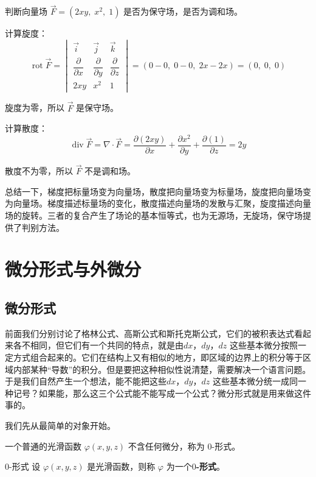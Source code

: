 \begin{myexample}
  判断向量场 \(\vec{F}=(2xy,\;x^2,\;1)\) 是否为保守场，是否为调和场。

  计算旋度：
  \[
  \operatorname{rot}\vec{F}
  =
  \begin{vmatrix}
  \vec{i} & \vec{j} & \vec{k} \\[2pt]
  \dfrac{\partial}{\partial x} & \dfrac{\partial}{\partial y} & \dfrac{\partial}{\partial z} \\[6pt]
  2xy & x^2 & 1
  \end{vmatrix}
  =
  (0-0,\;0-0,\;2x-2x)
  =
  (0,\;0,\;0)
  \]

  旋度为零，所以 \(\vec{F}\) 是保守场。

  计算散度：
  \[
  \operatorname{div}\vec{F}
  =
  \nabla \cdot \vec{F}
  =
  \frac{\partial (2xy)}{\partial x} + \frac{\partial x^2}{\partial y} + \frac{\partial (1)}{\partial z}
  =
  2y
  \]

  散度不为零，所以 \(\vec{F}\) 不是调和场。

\end{myexample}

总结一下，梯度把标量场变为向量场，散度把向量场变为标量场，旋度把向量场变为向量场。梯度描述标量场的变化，散度描述向量场的发散与汇聚，旋度描述向量场的旋转。三者的复合产生了场论的基本恒等式，也为无源场，无旋场，保守场提供了判别方法。

\section{微分形式与外微分}


\subsection{微分形式}
前面我们分别讨论了格林公式、高斯公式和斯托克斯公式，它们的被积表达式看起来各不相同，但它们有一个共同的特点，就是由\(dx\)，\(dy\)，\(dz\) 这些基本微分按照一定方式组合起来的。它们在结构上又有相似的地方，即区域的边界上的积分等于区域内部某种“导数”的积分。但是要把这种相似性说清楚，需要解决一个语言问题。于是我们自然产生一个想法，能不能把这些\(dx\)，\(dy\)，\(dz\) 这些基本微分统一成同一种记号？如果能，那么这三个公式能不能写成一个公式？微分形式就是用来做这件事的。

我们先从最简单的对象开始。

一个普通的光滑函数 $\varphi(x,y,z)$ 不含任何微分，称为 $0$-形式。

\begin{definition}{0-形式}{}
设 $\varphi(x,y,z)$ 是光滑函数，则称 $\varphi$ 为一个\textbf{$0$-形式}。
\end{definition}

